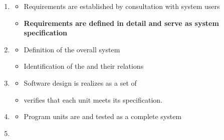 \documentclass[
    ../../Software_Engineering_Summary.tex,
]
{subfiles}
\begin{document}
\begin{defbox}
	\begin{enumerate}
        \item {}
        \begin{itemize}
            \item Requirements are established by consultation with system users
            \item \textbf{Requirements are defined in detail and serve as system specification}
        \end{itemize}
        \item {}
        \begin{itemize}
            \item Definition of the overall system 
            \item Identification of the  and their relations
        \end{itemize}
        \item {}
        \begin{itemize}
            \item Software design is realizes as a set of 
            \item {} verifies that each unit meets its specification.
        \end{itemize}
        \item {}
        \begin{itemize}
            \item Program units are  and tested as a complete system
        \end{itemize}
        \item {}
    \end{enumerate}
\end{defbox}
\end{document}
